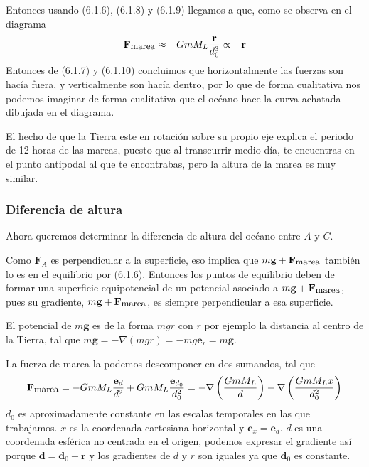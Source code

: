 Entonces usando (6.1.6), (6.1.8) y (6.1.9) llegamos a que, como se observa en el diagrama
\begin{equation} \label{6.1.1}
    \mathbf{F}_{\mbox{\small marea}}\approx-GmM_L\frac{\mathbf{r}}{d_0^3} \propto -\mathbf{r}
\end{equation} 
Entonces de (6.1.7) y (6.1.10) concluimos que horizontalmente las fuerzas son hacía fuera, y verticalmente son hacía dentro, por lo que de forma cualitativa nos podemos imaginar de forma cualitativa que el océano hace la curva achatada dibujada en el diagrama.

El hecho de que la Tierra este en rotación sobre su propio eje explica el periodo de 12 horas de las mareas, puesto que al transcurrir medio día, te encuentras en el punto antipodal al que te encontrabas, pero la altura de la marea es muy similar.

\subsubsection{Diferencia de altura}
Ahora queremos determinar la diferencia de altura del océano entre $A$ y $C$.

Como $\mathbf{F}_A$ es perpendicular a la superficie, eso implica que $m\mathbf{g}+\mathbf{F}_{\mbox{\small marea}}$ también lo es en el equilibrio por (6.1.6). Entonces los puntos de equilibrio deben de formar una superficie equipotencial de un potencial asociado a $m\mathbf{g}+\mathbf{F}_{\mbox{\small marea}}$, pues su gradiente, $m\mathbf{g}+\mathbf{F}_{\mbox{\small marea}}$, es siempre perpendicular a esa superficie.

El potencial de $m\mathbf{g}$ es de la forma $mgr$ con $r$ por ejemplo la distancia al centro de la Tierra, tal que $m\mathbf{g}=-\nabla(mgr)=-mg\mathbf{e}_r=m\mathbf{g}$.

La fuerza de marea la podemos descomponer en dos sumandos, tal que
\begin{equation} \label{6.1.1}
    \mathbf{F}_{\mbox{\small marea}}= -GmM_L\frac{\mathbf{e}_d}{d^2}+GmM_L\frac{\mathbf{e}_{d_0}}{d_0^2}=-\nabla\left(\frac{GmM_L}{d}\right)-\nabla\left(\frac{GmM_Lx}{d_0^2}\right)
\end{equation} 
$d_0$ es aproximadamente constante en las escalas temporales en las que trabajamos. $x$ es la coordenada cartesiana horizontal y $\mathbf{e}_x=\mathbf{e}_d$. $d$ es una coordenada esférica no centrada en el origen, podemos expresar el gradiente así porque $\mathbf{d}=\mathbf{d}_0+\mathbf{r}$ y los gradientes de $d$ y $r$ son iguales ya que $\mathbf{d}_0$ es constante.

